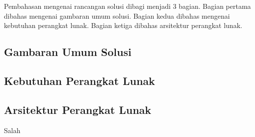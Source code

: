     Pembahasan mengenai rancangan solusi dibagi menjadi 3 bagian. Bagian pertama dibahas mengenai gambaran umum solusi. Bagian kedua dibahas mengenai kebutuhan perangkat lunak. Bagian ketiga dibahas arsitektur perangkat lunak. 

    \subsection{Gambaran Umum Solusi}

      \blindtext

    \subsection{Kebutuhan Perangkat Lunak}

      \blindtext

    \subsection{Arsitektur Perangkat Lunak}

      Salah\blindtext